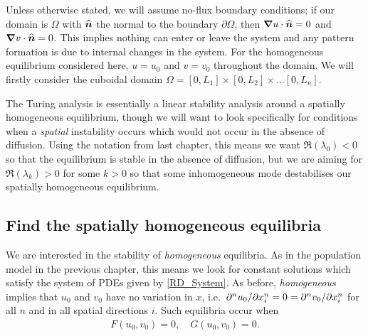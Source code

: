 \documentclass[main.tex]{subfiles}
\begin{document}
Unless otherwise stated, we will assume no-flux  boundary conditions; if our domain is $\Omega$ with $\uv{n}$ the normal to the boundary $\partial \Omega$, then $\vnabla u\cdot \uv{n}=0$ and $\vnabla v\cdot \uv{n}=0$. This implies nothing can enter or leave the system and any pattern formation is due to internal changes in the system. For the homogeneous equilibrium considered here, $u=u_0$ and $v=v_0$ throughout the domain. We will firstly consider the cuboidal domain $\Omega = [0,L_1]\times[0,L_2]\times\dots [0,L_n]$.

The Turing analysis is essentially a linear stability analysis around a spatially homogeneous equilibrium, though we will want to look specifically for conditions when a \emph{spatial} instability occurs which would not occur in the absence of diffusion. Using the notation from last chapter, this means we want $\Re(\lambda_0)<0$ so that the equilibrium is stable in the absence of diffusion, but we are aiming for $\Re(\lambda_k)>0$ for some $k>0$ so that some inhomogeneous mode destabilises our spatially homogeneous equilibrium.


\subsection*{Find the spatially homogeneous equilibria}
We are interested in the stability of \emph{homogeneous} equilibria. As in the population model in the previous chapter, this means we look for constant solutions which satisfy the system of PDEs given by \cref{RD_System}. As before, \emph{homogeneous} implies that $u_0$ and $v_0$ have no variation in $x$, i.e.\ $\pdn{n}{u_0}{x_i}=0=\pdn{n}{v_0}{x_i}$ for all $n$ and in all spatial directions $i$. Such equilibria occur when 
\begin{align}
F(u_0,v_0) = 0,\quad G(u_0,v_0)= 0.
\end{align}
\end{document}
